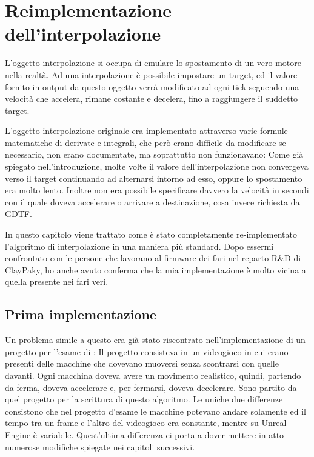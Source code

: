 \documentclass[main.tex]{subfiles}
\begin{document}
\sloppy

\vspace{1.0cm}

\section{Reimplementazione dell'interpolazione}\label{sec:Interpolation}
\lstset{language=UEcpp}
L'oggetto interpolazione si occupa di emulare lo spostamento di un vero motore nella realtà. Ad una interpolazione è possibile impostare un target, ed il valore fornito in output da questo oggetto verrà modificato ad ogni tick seguendo una velocità che accelera, rimane costante e decelera, fino a raggiungere il suddetto target.

L'oggetto interpolazione originale era implementato attraverso varie formule matematiche di derivate e integrali, che però erano difficile da modificare se necessario, non erano documentate, ma soprattutto non funzionavano: Come già spiegato nell'introduzione, molte volte il valore dell'interpolazione non convergeva verso il target continuando ad alternarsi intorno ad esso, oppure lo spostamento era molto lento. Inoltre non era possibile specificare davvero la velocità in secondi con il quale doveva accelerare o arrivare a destinazione, cosa invece richiesta da GDTF.\newline

In questo capitolo viene trattato come è stato completamente re-implementato l'algoritmo di interpolazione in una maniera più standard. Dopo essermi confrontato con le persone che lavorano al firmware dei fari nel reparto R\&D di ClayPaky, ho anche avuto conferma che la mia implementazione è molto vicina a quella presente nei fari veri.

\subsection{Prima implementazione}\label{subsec:4_trafficImplementation}
Un problema simile a questo era già stato riscontrato nell'implementazione di un progetto per l'esame di  \cite{TrafficGame}: Il progetto consisteva in un videogioco in cui erano presenti delle macchine che dovevano muoversi senza scontrarsi con quelle davanti. Ogni macchina doveva avere un movimento realistico, quindi, partendo da ferma, doveva accelerare e, per fermarsi, doveva decelerare. Sono partito da quel progetto per la scrittura di questo algoritmo. Le uniche due differenze consistono che nel progetto d'esame le macchine potevano andare solamente  ed il tempo tra un frame e l'altro del videogioco era constante, mentre su Unreal Engine è variabile. Quest'ultima differenza ci porta a dover mettere in atto numerose modifiche spiegate nei capitoli successivi.\newline
\end{document}
